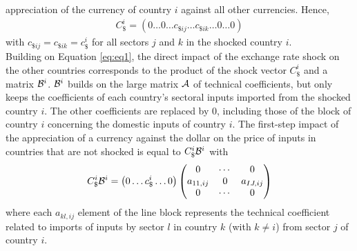 \documentclass[12pt,a4paper]{paper}
\begin{document}
appreciation of the currency of country $i$ against all other currencies.
Hence,
\begin{eqnarray*}
C_\$^i=\left(0\ldots0\ldots c_{\$ij}\ldots c_{\$ik}\dots 0\ldots0\right)
\end{eqnarray*}
with $c_{\$ij}=c_{\$ik}=c_\$^i
$
for all sectors $j$ and $k$ in the shocked country $i$.\\
Building on Equation \ref{eq:eq1}, the direct impact of the exchange rate shock on the other countries corresponds to the product of the shock vector $C_\$^i$ and a matrix ${\cal B}^i$. 
${\cal B}^i$ builds on the large matrix ${\cal A}$ of technical coefficients, but only keeps the coefficients of each country's sectoral inputs imported from the shocked country $i$. The other coefficients are replaced by 0, including those of the block of country $i$ concerning the domestic inputs of country $i$. 
The first-step impact of the appreciation of a currency against the dollar on the price of inputs in countries that are not shocked is equal to $C_\$^i{\cal B}^i$ with
\begin{eqnarray}
C_\$^i{\cal B}^i=\left(0\ldots c_\$^i \ldots 0\right)\left(\begin{matrix}0&\cdots&0\\a_{11,ij}&0&a_{IJ,ij}\\0&\cdots&0\\\end{matrix}\right) 	
\label{eq:eq3}
\end{eqnarray}
where each $a_{kl,ij}$ element of the line block represents the technical coefficient related to imports of inputs by sector $l$ in country $k$ (with $k\ne i$) from sector $j$ of country $i$.\\
\end{document}
